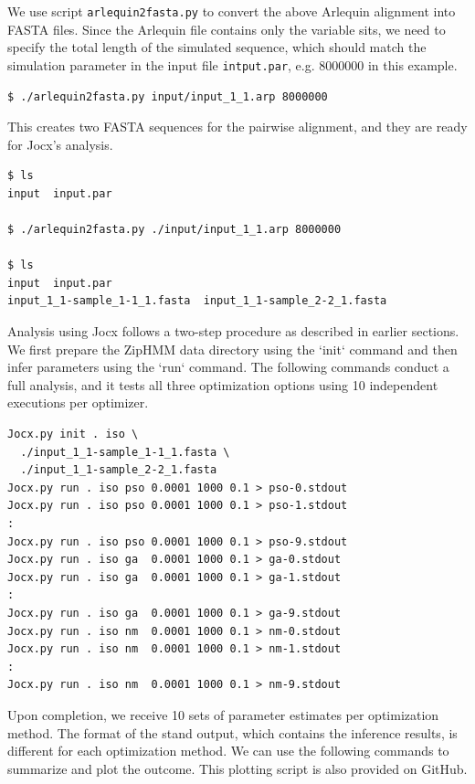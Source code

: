 \documentclass[graybox]{svmult}
\begin{document}
We use script \texttt{arlequin2fasta.py} to convert the above Arlequin alignment into FASTA files.  Since the Arlequin file contains only the variable sits, we need to specify the total length of the simulated sequence, which should match the simulation parameter in the input file \texttt{intput.par}, e.g. 8000000 in this example.

 {\scriptsize{}\begin{verbatim}
$ ./arlequin2fasta.py input/input_1_1.arp 8000000
\end{verbatim}}

This creates two FASTA sequences for the pairwise alignment, and they are ready for Jocx's analysis.

 {\scriptsize{}\begin{verbatim}
$ ls
input  input.par

$ ./arlequin2fasta.py ./input/input_1_1.arp 8000000

$ ls
input  input.par
input_1_1-sample_1-1_1.fasta  input_1_1-sample_2-2_1.fasta
\end{verbatim}}

Analysis using Jocx follows a two-step procedure as described in earlier sections.  We first prepare the ZipHMM data directory using the `init` command and then infer parameters using the `run` command.  The following commands conduct a full analysis, and it tests all three optimization options using 10 independent executions per optimizer.

{\scriptsize{}\begin{verbatim}
Jocx.py init . iso \
  ./input_1_1-sample_1-1_1.fasta \
  ./input_1_1-sample_2-2_1.fasta
Jocx.py run . iso pso 0.0001 1000 0.1 > pso-0.stdout
Jocx.py run . iso pso 0.0001 1000 0.1 > pso-1.stdout
:
Jocx.py run . iso pso 0.0001 1000 0.1 > pso-9.stdout
Jocx.py run . iso ga  0.0001 1000 0.1 > ga-0.stdout
Jocx.py run . iso ga  0.0001 1000 0.1 > ga-1.stdout
:
Jocx.py run . iso ga  0.0001 1000 0.1 > ga-9.stdout
Jocx.py run . iso nm  0.0001 1000 0.1 > nm-0.stdout
Jocx.py run . iso nm  0.0001 1000 0.1 > nm-1.stdout
:
Jocx.py run . iso nm  0.0001 1000 0.1 > nm-9.stdout
\end{verbatim}}

Upon completion, we receive 10 sets of parameter estimates per optimization method.  The format of the stand output, which contains the inference results, is different for each optimization method.  We can use the following commands to summarize and plot the outcome.  This plotting script is also provided on GitHub.
\end{document}
